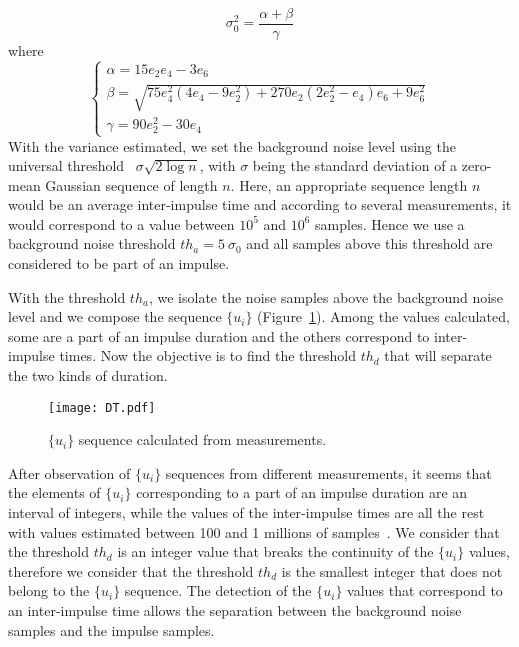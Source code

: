 \documentclass[journal]{IEEEtran}
\begin{document}
\begin{equation}\label{varg}
    \sigma_0^2=\frac{\alpha + \beta}{\gamma}
\end{equation}
where
      $$
\left\{
    \begin{array}{lll}
        \alpha=15e_2e_4-3e_6  \\
        \beta=\sqrt{75e_4^2(4e_4-9e_2^2)+270e_2(2e_2^2-e_4)e_6+9e_6^2} \\
        \gamma=90e_2^2-30e_4
    \end{array}
\right.
$$
With the variance estimated, we set the background noise level using the universal threshold~\cite{univ} $\sigma \sqrt{2\log n}$, with $\sigma$ being the standard deviation of a zero-mean Gaussian sequence of length $n$. Here, an appropriate sequence length $n$ would be an average inter-impulse time and according to several measurements, it would correspond to a value between $10^5$ and $10^6$ samples. Hence we use a background noise threshold $th_a=5\ \sigma_0$ and all samples above this threshold are considered to be part of an impulse.\

With the threshold $th_a$, we isolate the noise samples above the background noise level and we compose the sequence $\{u_i\}$ (Figure~\ref{DT}). Among the values calculated, some are a part of an impulse duration and the others correspond to inter-impulse times. Now the objective is to find the threshold $th_d$ that will separate the two kinds of duration.
\begin{figure}[h]
\begin{center}
  \texttt{[image: DT.pdf]}\\
\end{center}
  \caption{$\{u_i\}$ sequence calculated from measurements.}\label{DT}
\end{figure}
After observation of $\{u_i\}$ sequences from different measurements, it seems that the elements of $\{u_i\}$ corresponding to a part of an impulse duration are an interval of integers, while the values of the inter-impulse times are all the rest with values estimated between 100 and 1 millions of samples~\cite{cigre}. We consider that the threshold $th_d$ is an integer value that breaks the continuity of the $\{u_i\}$ values, therefore we consider that the threshold $th_d$ is the smallest integer that does not belong to the $\{u_i\}$ sequence. The detection of the $\{u_i\}$ values that correspond to an inter-impulse time allows the separation between the background noise samples and the impulse samples.\
\end{document}
